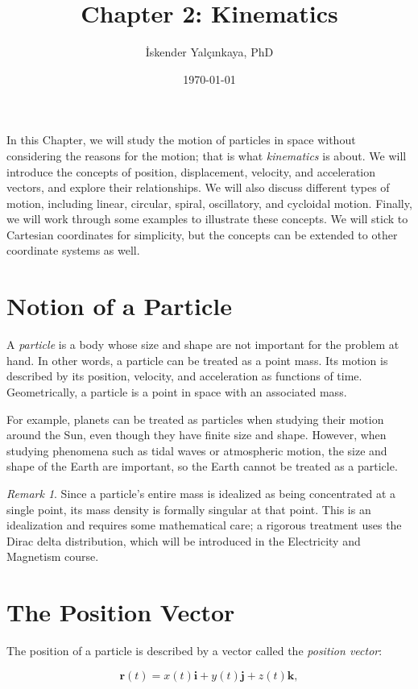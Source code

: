 \documentclass[12pt]{article}
\title{Chapter 2: Kinematics}
\author{İskender Yalçınkaya, PhD}
\date{\today}
\theoremstyle{remark}
\newtheorem*{remark}{Remark}
\begin{document}
\maketitle

In this Chapter, we will study the motion of particles in space without considering the reasons for the motion; that is what \emph{kinematics} is about. We will introduce the concepts of position, displacement, velocity, and acceleration vectors, and explore their relationships. We will also discuss different types of motion, including linear, circular, spiral, oscillatory, and cycloidal motion. Finally, we will work through some examples to illustrate these concepts. We will stick to Cartesian coordinates for simplicity, but the concepts can be extended to other coordinate systems as well.

\section{Notion of a Particle}
A \emph{particle} is a body whose size and shape are not important for the problem at hand. In other words, a particle can be treated as a point mass. Its motion is described by its position, velocity, and acceleration as functions of time. Geometrically, a particle is a point in space with an associated mass.

For example, planets can be treated as particles when studying their motion around the Sun, even though they have finite size and shape. However, when studying phenomena such as tidal waves or atmospheric motion, the size and shape of the Earth are important, so the Earth cannot be treated as a particle.

\begin{remark}
Since a particle's entire mass is idealized as being concentrated at a single point, its mass density is formally singular at that point. This is an idealization and requires some mathematical care; a rigorous treatment uses the Dirac delta distribution, which will be introduced in the Electricity and Magnetism course.
\end{remark}


\section{The Position Vector}

The position of a particle is described by a vector called the \emph{position vector}:

\begin{equation}
\mathbf{r}(t) = x(t)\mathbf{i} + y(t)\mathbf{j} + z(t)\mathbf{k},
\end{equation}
\end{document}
